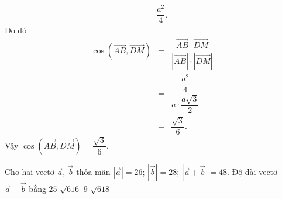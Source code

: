 \begin{ex}
{\begin{eqnarray*}
			 &=&\dfrac{a^2}{4}.
		\end{eqnarray*}
		Do đó 
		\begin{eqnarray*}
			\cos\left(\overrightarrow{AB},\overrightarrow{DM}\right) &=&\dfrac{\overrightarrow{AB}\cdot \overrightarrow{DM}}{\left|\overrightarrow{AB}\right|\cdot \left|\overrightarrow{DM}\right|}\\ 
			 &=&\dfrac{\dfrac{a^2}{4}}{a\cdot\dfrac{a\sqrt{3}}{2}}\\
			& =& \dfrac{\sqrt{3}}{6}. 
		\end{eqnarray*}
		Vậy $\cos\left(\overrightarrow{AB},\overrightarrow{DM}\right) = \dfrac{\sqrt{3}}{6}$. 
	 }
\end{ex}

\begin{ex}%
	Cho hai vectơ  $\overrightarrow{a}$, $\overrightarrow{b}$ thỏa mãn $\left|\overrightarrow{a}\right|=26$; $\left|\overrightarrow{b}\right|=28$; $\left|\overrightarrow{a}+\overrightarrow{b}\right|=48$. Độ dài vectơ $\overrightarrow{a}-\overrightarrow{b}$ bằng
	 \choice
		 {$25$}
		{\True  $\sqrt{616}$}
		 {$9$}
		{$\sqrt{618}$} 
\end{ex}

